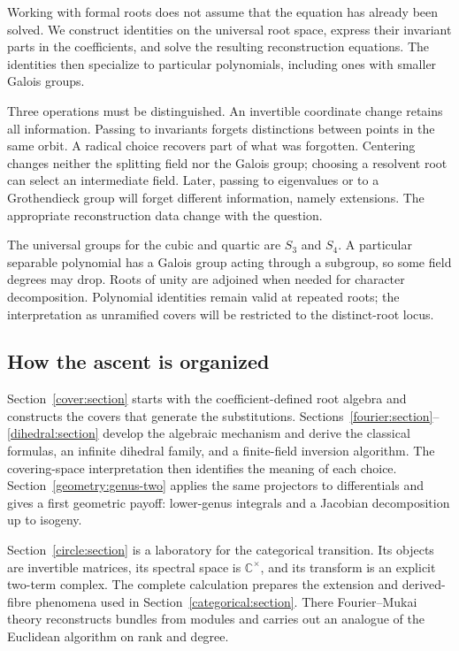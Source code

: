 \documentclass[11pt]{article}
\theoremstyle{remark}
\newcommand{\C}{\mathbb C}
\begin{document}
Working with formal roots does not assume that the equation has already been solved. We construct identities on the universal root space, express their invariant parts in the coefficients, and solve the resulting reconstruction equations. The identities then specialize to particular polynomials, including ones with smaller Galois groups.

Three operations must be distinguished. An invertible coordinate change retains all information. Passing to invariants forgets distinctions between points in the same orbit. A radical choice recovers part of what was forgotten. Centering changes neither the splitting field nor the Galois group; choosing a resolvent root can select an intermediate field. Later, passing to eigenvalues or to a Grothendieck group will forget different information, namely extensions. The appropriate reconstruction data change with the question.

The universal groups for the cubic and quartic are \(S_3\) and \(S_4\). A particular separable polynomial has a Galois group acting through a subgroup, so some field degrees may drop. Roots of unity are adjoined when needed for character decomposition. Polynomial identities remain valid at repeated roots; the interpretation as unramified covers will be restricted to the distinct-root locus.

\subsection{How the ascent is organized}

Section~\ref{cover:section} starts with the coefficient-defined root algebra and constructs the covers that generate the substitutions. Sections~\ref{fourier:section}--\ref{dihedral:section} develop the algebraic mechanism and derive the classical formulas, an infinite dihedral family, and a finite-field inversion algorithm. The covering-space interpretation then identifies the meaning of each choice. Section~\ref{geometry:genus-two} applies the same projectors to differentials and gives a first geometric payoff: lower-genus integrals and a Jacobian decomposition up to isogeny.

Section~\ref{circle:section} is a laboratory for the categorical transition. Its objects are invertible matrices, its spectral space is \(\C^\times\), and its transform is an explicit two-term complex. The complete calculation prepares the extension and derived-fibre phenomena used in Section~\ref{categorical:section}. There Fourier--Mukai theory reconstructs bundles from modules and carries out an analogue of the Euclidean algorithm on rank and degree.
\end{document}
